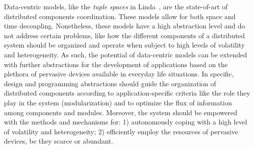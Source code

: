 Data-centric models, like the \textit{tuple spaces} in Linda~\cite{LINDA}, are the state-of-art of distributed components coordination. These models allow for both space and time decoupling. %
Nonetheless, these models have a high abstraction level and do not address certain problems, like how the different components of a distributed system should be organized and operate when subject to high levels of volatility and heterogeneity. As such, the potential of data-centric models can be extended with further abstractions for the development of applications based on the plethora of pervasive devices available in everyday life situations. In specific, design and programming abstractions should guide the organization of distributed components according to application-specific criteria like the role they play in the system (modularization) and to optimize the flux of information among components and modules. Moreover, the system should be empowered with the methods and mechanisms for: 1) autonomously coping with a high level of volatility and heterogeneity; 2) efficiently employ the resources of pervasive devices, be they scarce or abundant.



